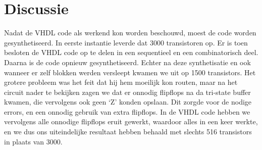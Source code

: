 \documentclass{scrreprt} %
\begin{document}
\section{Discussie}
Nadat de VHDL code als werkend kon worden beschouwd, moest de code worden gesynthetiseerd. In eerste instantie leverde dat 3000 transistoren op. Er is toen besloten de VHDL code op te delen in een sequentieel en een combinatorisch deel. Daarna is de code opnieuw gesynthetiseerd.  Echter na deze synthetisatie en ook wanneer er zelf blokken werden versleept kwamen we uit op 1500 transistors. Het grotere probleem was het feit dat hij hem moeilijk kon routen, maar na het circuit nader te bekijken zagen we dat er onnodig flipflops na da tri-state buffer kwamen, die vervolgens ook geen ‘Z’ konden opslaan. Dit zorgde voor de nodige errors, en een onnodig gebruik van extra flipflops. In de VHDL code hebben we vervolgens alle onnodige flipflops eruit gewerkt, waardoor alles in een keer werkte, en we dus ons uiteindelijke resultaat hebben behaald met slechts 516 transistors in plaats van 3000. 
\end{document}
